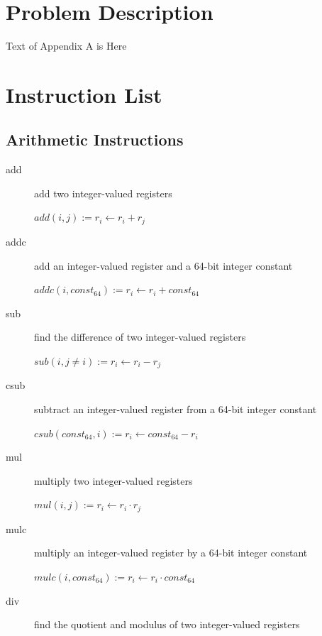 \documentclass[english,a4paper]{article}
\begin{document}
\newpage{}
\appendix
\section{Problem Description} 

Text of Appendix A is Here

\section{Instruction List} 

\subsection{Arithmetic Instructions}
\begin{description}
	\item[add] add two integer-valued registers
	
	$add(i, j) := r _{i} \longleftarrow  r _{i} + r_{j} $ \\
	
	\item[addc] add an integer-valued register and a 64-bit integer
	constant
	
	$addc(i, const _{64}) := r _{i} \longleftarrow  r _{i} + const 
	_{64} $ \\
	
	\item[sub] find the difference of two integer-valued registers
	
	$sub(i, j\neq i) := r _{i} \longleftarrow  r _{i} - r _{j} $ \\
	
	\item[csub] subtract an integer-valued register from a 64-bit 
	integer
	constant
	
	$csub(const _{64}, i) := r _{i} \longleftarrow const _{64} - r 
	_{i} $ \\
	
	\item[mul] multiply two integer-valued registers
	
	$mul(i, j) := r _{i} \longleftarrow  r _{i} \cdot r _{j} $ \\
	
	\item[mulc] multiply an integer-valued register by a 64-bit 
	integer
	constant
	
	$mulc(i, const _{64}) := r _{i} \longleftarrow r _{i} \cdot const 
	_{64} $
	
	\item[div] find the quotient and modulus of two integer-valued
	registers
	

\end{description}
\end{document}
